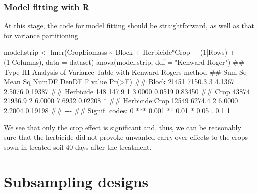 \documentclass[a4paper,12pt,oneside]{book}
\newenvironment{Shaded}{\begin{snugshade}}{\end{snugshade}}
\newcommand{\DecValTok}[1]{#1}
\newcommand{\SpecialCharTok}[1]{#1}
\newcommand{\StringTok}[1]{#1}
\newcommand{\DocumentationTok}[1]{#1}
\newcommand{\OtherTok}[1]{#1}
\newcommand{\FunctionTok}[1]{#1}
\newcommand{\AttributeTok}[1]{#1}
\newcommand{\NormalTok}[1]{#1}
\begin{document}
\hypertarget{model-fitting-with-r-3}{%
\subsubsection{Model fitting with R}\label{model-fitting-with-r-3}}

At this stage, the code for model fitting should be straightforward, as well as that for variance partitioning

\begin{Shaded}
\begin{Highlighting}[]
\NormalTok{model.strip }\OtherTok{\textless{}{-}} \FunctionTok{lmer}\NormalTok{(CropBiomass }\SpecialCharTok{\textasciitilde{}}\NormalTok{ Block }\SpecialCharTok{+}\NormalTok{ Herbicide}\SpecialCharTok{*}\NormalTok{Crop }\SpecialCharTok{+} 
\NormalTok{    (}\DecValTok{1}\SpecialCharTok{|}\NormalTok{Rows) }\SpecialCharTok{+}\NormalTok{ (}\DecValTok{1}\SpecialCharTok{|}\NormalTok{Columns), }\AttributeTok{data =}\NormalTok{ dataset)}
\FunctionTok{anova}\NormalTok{(model.strip, }\AttributeTok{ddf =} \StringTok{"Kenward{-}Roger"}\NormalTok{)}
\DocumentationTok{\#\# Type III Analysis of Variance Table with Kenward{-}Roger\textquotesingle{}s method}
\DocumentationTok{\#\#                Sum Sq Mean Sq NumDF  DenDF F value  Pr(\textgreater{}F)  }
\DocumentationTok{\#\# Block           21451  7150.3     3 4.1367  2.5076 0.19387  }
\DocumentationTok{\#\# Herbicide         148   147.9     1 3.0000  0.0519 0.83450  }
\DocumentationTok{\#\# Crop            43874 21936.9     2 6.0000  7.6932 0.02208 *}
\DocumentationTok{\#\# Herbicide:Crop  12549  6274.4     2 6.0000  2.2004 0.19198  }
\DocumentationTok{\#\# {-}{-}{-}}
\DocumentationTok{\#\# Signif. codes:  0 \textquotesingle{}***\textquotesingle{} 0.001 \textquotesingle{}**\textquotesingle{} 0.01 \textquotesingle{}*\textquotesingle{} 0.05 \textquotesingle{}.\textquotesingle{} 0.1 \textquotesingle{} \textquotesingle{} 1}
\end{Highlighting}
\end{Shaded}

We see that only the crop effect is significant and, thus, we can be reasonably sure that the herbicide did not provoke unwanted carry-over effects to the crops sown in treated soil 40 days after the treatment.

\hypertarget{subsampling-designs}{%
\section{Subsampling designs}\label{subsampling-designs}}
\end{document}

